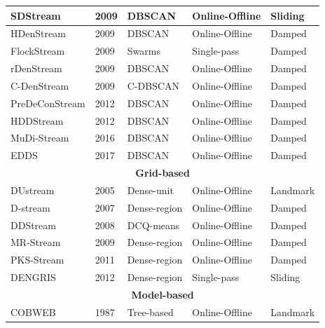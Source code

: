 \begin{table}[]
\begin{tabular}{lllll}
SDStream            & 2009          & DBSCAN            & Online-Offline      & Sliding              \\ \hline
HDenStream          & 2009          & DBSCAN            & Online-Offline      & Damped               \\ \hline
FlockStream         & 2009          & Swarms            & Single-pass         & Damped               \\ \hline
rDenStream          & 2009          & DBSCAN            & Online-Offline      & Damped               \\ \hline
C-DenStream         & 2009          & C-DBSCAN          & Online-Offline      & Damped               \\ \hline
PreDeConStream      & 2012          & DBSCAN            & Online-Offline      & Damped               \\ \hline
HDDStream           & 2012          & DBSCAN            & Online-Offline      & Damped               \\ \hline
MuDi-Stream         & 2016          & DBSCAN            & Online-Offline      & Damped               \\ \hline
EDDS                & 2017          & DBSCAN            & Online-Offline      & Damped               \\ \hline
\multicolumn{5}{c}{\cellcolor[HTML]{C0C0C0}\textbf{Grid-based}}                                      \\ \hline
DUstream            & 2005          & Dense-unit        & Online-Offline      & Landmark             \\ \hline
D-stream            & 2007          & Dense-region      & Online-Offline      & Damped               \\ \hline
DDStream            & 2008          & DCQ-means         & Online-Offline      & Damped               \\ \hline
MR-Stream           & 2009          & Dense-region      & Online-Offline      & Damped               \\ \hline
PKS-Stream          & 2011          & Dense-region      & Online-Offline      & Damped               \\ \hline
DENGRIS             & 2012          & Dense-region      & Single-pass         & Sliding              \\ \hline
\multicolumn{5}{c}{\cellcolor[HTML]{C0C0C0}\textbf{Model-based}}                                     \\ \hline
COBWEB              & 1987          & Tree-based        & Online-Offline      & Landmark             \\ \hline

\end{tabular}
\end{table}
